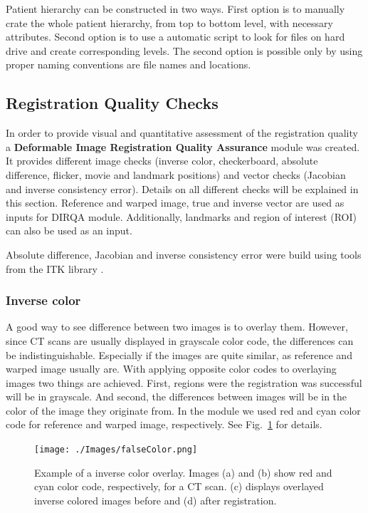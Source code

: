 \documentclass[type=dr, dr=rernat, accentcolor=tud7b,colorbacktitle, bigchapter, openright, twoside, 12pt ]{tudthesis}
\begin{document}
Patient hierarchy can be constructed in two ways. First option is to manually crate the whole patient hierarchy, from top to bottom level, with necessary attributes. Second option is to use a automatic script to look 
for files on hard drive and create corresponding levels. The second option is possible only by using proper naming conventions are file names and locations.

\subsection{Registration Quality Checks}
\label{DIRQA}

In order to provide visual and quantitative assessment of the registration quality a \textbf{Deformable Image Registration Quality Assurance} module was created. It provides different image checks (inverse color, checkerboard, absolute difference, flicker, movie and landmark positions) and vector checks (Jacobian and inverse consistency error). Details on all different checks will be explained in this section. Reference and warped image, true and inverse vector are used as inputs for DIRQA module. Additionally, landmarks and region of interest (ROI) can also be used as an input.

Absolute difference, Jacobian and inverse consistency error were build using tools from the ITK library \cite{Yoo2002}.

\subsubsection{Inverse color}
\label{Sec:FalseColor}

A good way to see difference between two images is to overlay them. However, since CT scans are usually displayed in grayscale color code, the differences can be indistinguishable. Especially if the images are quite similar, as reference and warped image usually are. With applying opposite color codes to overlaying images two things are achieved. First, regions were the registration was successful will be in grayscale. And second, the differences between images will be in the color of the image they originate from. In the module we used red and cyan color code for reference and warped image, respectively. See Fig.~\ref{falseColor} for details.

\begin{figure}[H]
	\begin{center}		
		\texttt{[image: ./Images/falseColor.png]}
		\caption{Example of a inverse color overlay. Images (a) and (b) show red and cyan color code, respectively, for a CT scan. (c) displays overlayed inverse colored images before and (d) after registration.}
		\label{falseColor}
	\end{center}
\end{figure}
\newpage
\end{document}
